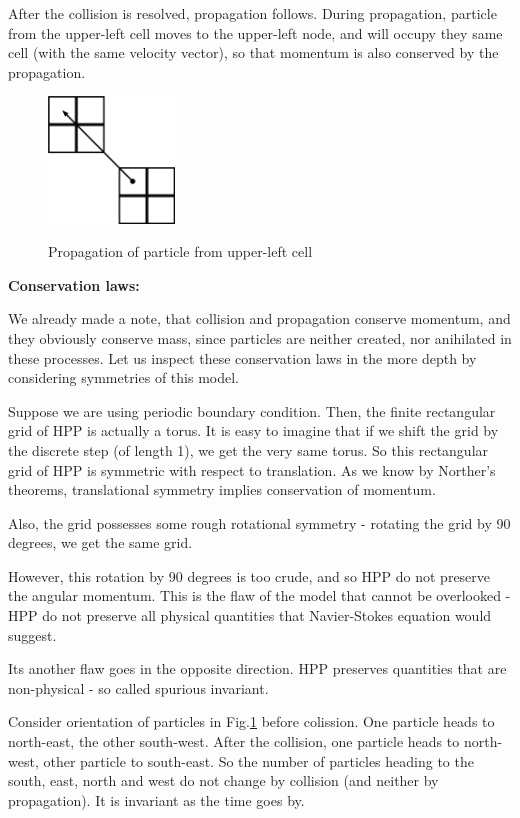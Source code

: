 After the collision is resolved, propagation follows.
During propagation, particle from the upper-left cell moves to the upper-left node, and will occupy they same cell (with the same velocity vector), so that momentum is also conserved by the propagation.

\begin{figure} [h]
 \centering
 \includegraphics[width=0.3\textwidth]{./img/propleft}
 \label{hpp-colision}
 \caption{Propagation of particle from upper-left cell}
\end{figure}

\bigskip

\textbf{Conservation laws:}

We already made a note, that collision and propagation conserve momentum, and they obviously conserve mass, since particles are neither created, nor anihilated in these processes. 
Let us inspect these conservation laws in the more depth by considering symmetries of this model.

Suppose we are using periodic boundary condition. Then, the finite rectangular grid of HPP is actually a torus. It is easy to imagine that if we shift the grid by the discrete step (of length 1), we get the very same torus.
So this rectangular grid of HPP is symmetric with respect to translation.
As we know by Norther's theorems, translational symmetry implies conservation of momentum.

\bigskip

Also, the grid possesses some rough rotational symmetry - rotating the grid by 90 degrees, we get the same grid.

However, this rotation by 90 degrees is too crude, and so HPP do not preserve the angular momentum. This is the flaw of the model that cannot be overlooked - HPP do not preserve all physical quantities that Navier-Stokes equation would suggest.

Its another flaw goes in the opposite direction. HPP preserves quantities that are non-physical - so called spurious invariant.

Consider orientation of particles in Fig.\ref{hpp-colision} before colission.
One particle heads to north-east, the other south-west.
After the collision, one particle heads to north-west, other particle to south-east.
So the number of particles heading to the south, east, north and west do not change by collision (and neither by propagation). It is invariant as the time goes by.

